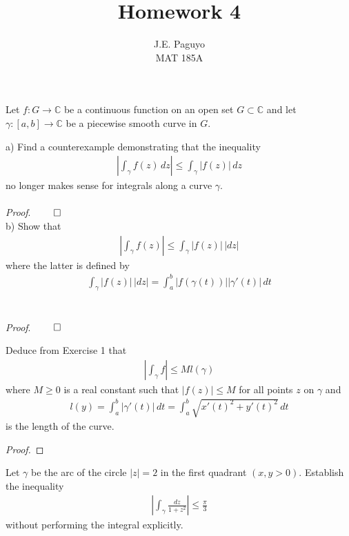 \documentclass[12pt]{article}
\newcommand{\C}{\mathbb{C}}
\newenvironment{exercise}[2][Exercise]{\begin{trivlist}
\item[\hskip \labelsep {\bfseries #1}\hskip \labelsep {\bfseries #2.}]}{\end{trivlist}}
\begin{document}
 
\title{Homework 4} 
\author{J.E. Paguyo \\ MAT 185A} 
\maketitle
 
\begin{exercise}{1} Let $f: G \to \C$ be a continuous function on an open set $G \subset \C$ and let $\gamma : [a,b] \to \C$ be a piecewise smooth curve in $G$. 
\end{exercise}
 
\noindent a) Find a counterexample demonstrating that the inequality 
\begin{align*}
\left| \int_{\gamma} f(z) \, dz \right| \leq \int_{\gamma} |f(z)| \, dz
\end{align*}
no longer makes sense for integrals along a curve $\gamma$. \\ \\
{\em Proof}. 
$\hfill \qed$ \\

\noindent b) Show that 
\begin{align*}
\left| \int_{\gamma} f(z) \right| \leq \int_{\gamma} |f(z)| \, |dz|
\end{align*}
where the latter is defined by 
\begin{align*}
\int_{\gamma} |f(z)| \, |dz| = \int_a^b |f(\gamma (t))||\gamma'(t)| \, dt 
\end{align*} \\ \\ 
{\em Proof}.
$\hfill \qed$ \\

\begin{exercise}{2} Deduce from Exercise 1 that 
\begin{align*}
\left| \int_{\gamma} f \right| \leq Ml(\gamma)
\end{align*}
where $M \geq 0$ is a real constant such that $|f(z)| \leq M$ for all points $z$ on $\gamma$ and 
\begin{align*}
l(y) = \int_a^b |\gamma'(t)| \, dt = \int_a^b \sqrt{x'(t)^2 + y'(t)^2} \, dt
\end{align*}
is the length of the curve. 
\end{exercise}
 
\begin{proof}

\end{proof}

\begin{exercise}{3} Let $\gamma$ be the arc of the circle $|z| = 2$ in the first quadrant $(x,y>0)$. Establish the inequality
\begin{align*}
\left| \int_{\gamma} \frac{dz}{1 + z^2} \right| \leq \frac{\pi}{3}
\end{align*}
without performing the integral explicitly. 
\end{exercise}
 
\end{document}
